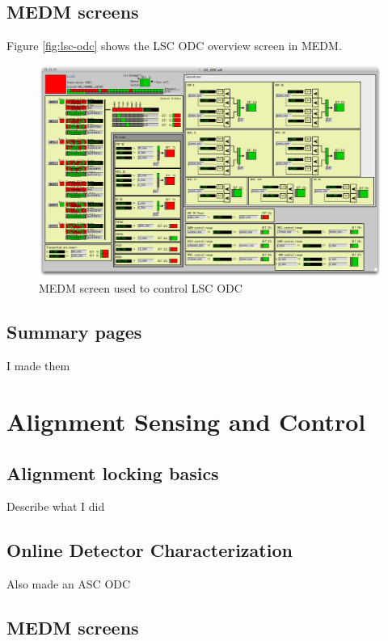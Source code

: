 \subsection{MEDM screens}

Figure \ref{fig:lsc-odc} shows the LSC ODC overview screen in MEDM.

\begin{figure}[ht!]
\includegraphics[width=\textwidth]{figures/ODC/LSC_screen}
\caption[LSC ODC Overview Screen]{MEDM screen used to control LSC ODC}
\end{figure}\label{fig:lsc-odc}

\subsection{Summary pages}
I made them

\section{Alignment Sensing and Control}

\subsection{Alignment locking basics}

Describe what I did

\subsection{Online Detector Characterization}

Also made an ASC ODC

\subsection{MEDM screens}

